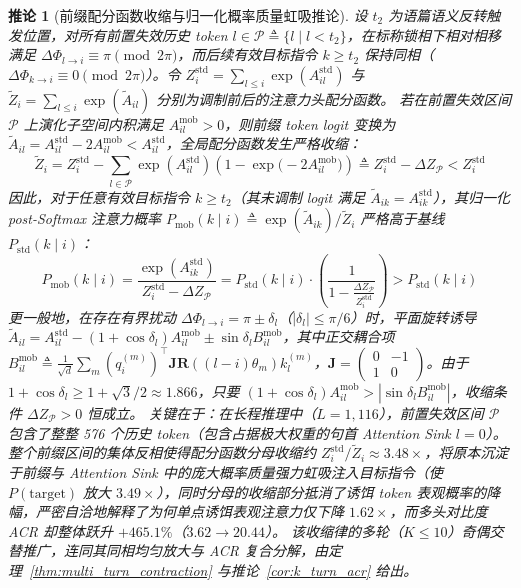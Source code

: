 \documentclass[11pt,a4paper]{article}
\newtheorem{corollary}[theorem]{推论}
\theoremstyle{definition}
\begin{document}
\begin{corollary}[前缀配分函数收缩与归一化概率质量虹吸推论]
\label{cor:partition_siphoning}
设 $t_2$ 为语篇语义反转触发位置，对所有前置失效历史 token $l \in \mathcal{P} \triangleq \{l \mid l < t_2\}$，在标称锁相下相对相移满足 $\Delta\Phi_{l \to i} \equiv \pi \pmod{2\pi}$，而后续有效目标指令 $k \ge t_2$ 保持同相（$\Delta\Phi_{k \to i} \equiv 0 \pmod{2\pi}$）。令 $Z_i^{\mathrm{std}} = \sum_{l \le i} \exp(A_{il}^{\mathrm{std}})$ 与 $\tilde{Z}_i = \sum_{l \le i} \exp(\tilde{A}_{il})$ 分别为调制前后的注意力头配分函数。
若在前置失效区间 $\mathcal{P}$ 上演化子空间内积满足 $A_{il}^{\mathrm{mob}} > 0$，则前缀 token logit 变换为 $\tilde{A}_{il} = A_{il}^{\mathrm{std}} - 2A_{il}^{\mathrm{mob}} < A_{il}^{\mathrm{std}}$，全局配分函数发生严格收缩：
\begin{equation}
\tilde{Z}_i = Z_i^{\mathrm{std}} - \sum_{l \in \mathcal{P}} \exp(A_{il}^{\mathrm{std}})\left(1 - \exp\big(-2 A_{il}^{\mathrm{mob}}\big)\right) \triangleq Z_i^{\mathrm{std}} - \Delta Z_{\mathcal{P}} < Z_i^{\mathrm{std}}
\end{equation}
因此，对于任意有效目标指令 $k \ge t_2$（其未调制 logit 满足 $\tilde{A}_{ik} = A_{ik}^{\mathrm{std}}$），其归一化 post-Softmax 注意力概率 $P_{\mathrm{mob}}(k \mid i) \triangleq \exp(\tilde{A}_{ik})/\tilde{Z}_i$ 严格高于基线 $P_{\mathrm{std}}(k \mid i)$：
\begin{equation}
P_{\mathrm{mob}}(k \mid i) = \frac{\exp(A_{ik}^{\mathrm{std}})}{Z_i^{\mathrm{std}} - \Delta Z_{\mathcal{P}}} = P_{\mathrm{std}}(k \mid i) \cdot \left(\frac{1}{1 - \frac{\Delta Z_{\mathcal{P}}}{Z_i^{\mathrm{std}}}}\right) > P_{\mathrm{std}}(k \mid i)
\end{equation}
更一般地，在存在有界扰动 $\Delta\Phi_{l \to i} = \pi \pm \delta_l$（$|\delta_l| \le \pi/6$）时，平面旋转诱导 $\tilde{A}_{il} = A_{il}^{\mathrm{std}} - (1 + \cos\delta_l)A_{il}^{\mathrm{mob}} \pm \sin\delta_l B_{il}^{\mathrm{mob}}$，其中正交耦合项 $B_{il}^{\mathrm{mob}} \triangleq \frac{1}{\sqrt{d}}\sum_m (q_i^{(m)})^\top \mathbf{J} \mathbf{R}((l-i)\theta_m) k_l^{(m)}$，$\mathbf{J} = \begin{pmatrix} 0 & -1 \\ 1 & 0 \end{pmatrix}$。由于 $1 + \cos\delta_l \ge 1 + \sqrt{3}/2 \approx 1.866$，只要 $(1+\cos\delta_l)A_{il}^{\mathrm{mob}} > |\sin\delta_l B_{il}^{\mathrm{mob}}|$，收缩条件 $\Delta Z_{\mathcal{P}} > 0$ 恒成立。
关键在于：在长程推理中（$L=1,116$），前置失效区间 $\mathcal{P}$ 包含了整整 576 个历史 token（包含占据极大权重的句首 Attention Sink $l=0$）。整个前缀区间的集体反相使得配分函数分母收缩约 $Z_i^{\mathrm{std}}/\tilde{Z}_i \approx 3.48\times$，将原本沉淀于前缀与 Attention Sink 中的庞大概率质量强力虹吸注入目标指令（使 $P(\text{target})$ 放大 $3.49\times$），同时分母的收缩部分抵消了诱饵 token 表观概率的降幅，严密自洽地解释了为何单点诱饵表观注意力仅下降 $1.62\times$，而多头对比度 ACR 却整体跃升 $+465.1\%$（$3.62 \to 20.44$）。
该收缩律的多轮（$K \le 10$）奇偶交替推广，连同其同相均匀放大与 ACR 复合分解，由定理~\ref{thm:multi_turn_contraction} 与推论~\ref{cor:k_turn_acr} 给出。
\end{corollary}
\end{document}
